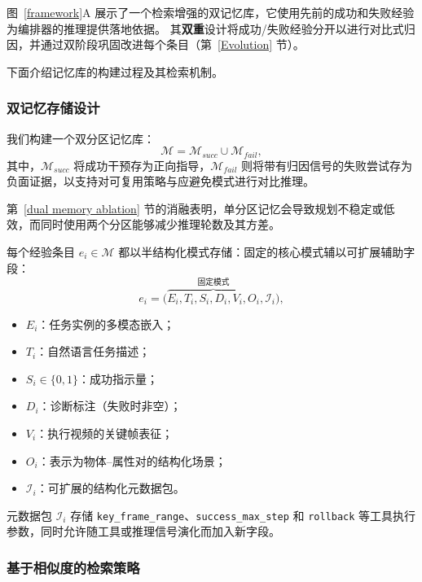 图~\ref{framework}A 展示了一个检索增强的双记忆库，它使用先前的成功和失败经验为编排器的推理提供落地依据。
其\textbf{双重}设计将成功/失败经验分开以进行对比式归因，并通过双阶段巩固改进每个条目（第~\ref{Evolution} 节）。

下面介绍记忆库的构建过程及其检索机制。

\subsubsection{双记忆存储设计}

我们构建一个双分区记忆库：
\begin{equation}
\mathcal{M} = \mathcal{M}_{succ} \cup \mathcal{M}_{fail},
\end{equation}
其中，$\mathcal{M}_{succ}$ 将成功干预存为正向指导，$\mathcal{M}_{fail}$ 则将带有归因信号的失败尝试存为负面证据，以支持对可复用策略与应避免模式进行对比推理。

第~\ref{dual memory ablation} 节的消融表明，单分区记忆会导致规划不稳定或低效，而同时使用两个分区能够减少推理轮数及其方差。

每个经验条目 $e_i \in \mathcal{M}$ 都以半结构化模式存储：固定的核心模式辅以可扩展辅助字段：
\vspace{-0.5em}
\begin{equation}
e_i = \big(
\overbrace{E_i, T_i, S_i, D_i, V_i, O_i}^{\text{固定模式}},
\mathcal{I}_i
\big),
\end{equation}
\begin{itemize}
    \item $E_i$：任务实例的多模态嵌入；
    \item $T_i$：自然语言任务描述；
    \item $S_i \in \{0,1\}$：成功指示量；
    \item $D_i$：诊断标注（失败时非空）；
    \item $V_i$：执行视频的关键帧表征；
    \item $O_i$：表示为物体--属性对的结构化场景；
    \item $\mathcal{I}_i$：可扩展的结构化元数据包。
\end{itemize}

元数据包 $\mathcal{I}_i$ 存储 \texttt{key\_frame\_range}、\texttt{success\_max\_step} 和 \texttt{rollback} 等工具执行参数，同时允许随工具或推理信号演化而加入新字段。

\subsubsection{基于相似度的检索策略}

